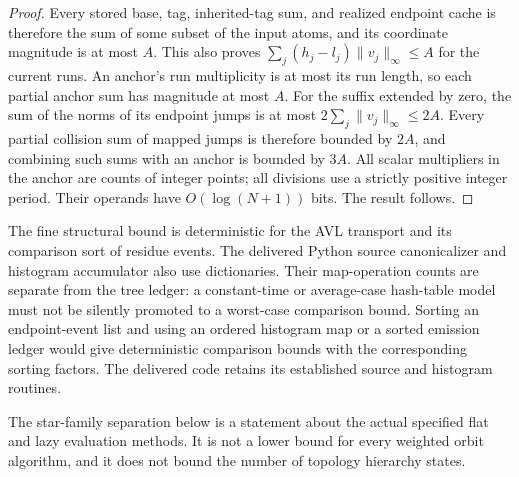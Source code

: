 \begin{proof}
Every stored base, tag, inherited-tag sum, and realized endpoint cache is
therefore the sum of some subset of the input atoms, and its coordinate
magnitude is at most $A$. This also proves
$\sum_j(h_j-l_j)\lVert v_j\rVert_\infty\le A$ for the current runs.
An anchor's run multiplicity is at most its run length, so each partial
anchor sum has magnitude at most $A$. For the suffix extended by zero,
the sum of the norms of its endpoint jumps is at most
$2\sum_j\lVert v_j\rVert_\infty\le2A$. Every partial collision sum of
mapped jumps is therefore bounded by $2A$, and combining such sums with
an anchor is bounded by $3A$. All scalar multipliers in the anchor are
counts of integer points; all divisions use a strictly positive integer
period. Their operands have $O(\log(N+1))$ bits. The result follows.
\end{proof}

The fine structural bound is deterministic for the AVL transport and its
comparison sort of residue events. The delivered Python source
canonicalizer and histogram accumulator also use dictionaries. Their
map-operation counts are separate from the tree ledger: a constant-time
or average-case hash-table model must not be silently promoted to a
worst-case comparison bound. Sorting an endpoint-event list and using an
ordered histogram map or a sorted emission ledger would give deterministic
comparison bounds with the corresponding sorting factors. The delivered
code retains its established source and histogram routines.

The star-family separation below is a statement about the actual specified
flat and lazy evaluation methods. It is not a lower bound for every weighted
orbit algorithm, and it does not bound the number of topology hierarchy
states.

